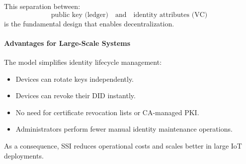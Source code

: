 \noindent
This separation between:
\[
\text{public key (ledger)} \quad \text{and} \quad \text{identity attributes (VC)}
\]
is the fundamental design that enables decentralization.

\paragraph{Advantages for Large-Scale Systems}
The model simplifies identity lifecycle management:
\begin{itemize}
    \item Devices can rotate keys independently.
    \item Devices can revoke their DID instantly.
    \item No need for certificate revocation lists or CA-managed PKI.
    \item Administrators perform fewer manual identity maintenance operations.
\end{itemize}

\noindent
As a consequence, SSI reduces operational costs and scales better in large IoT deployments.



